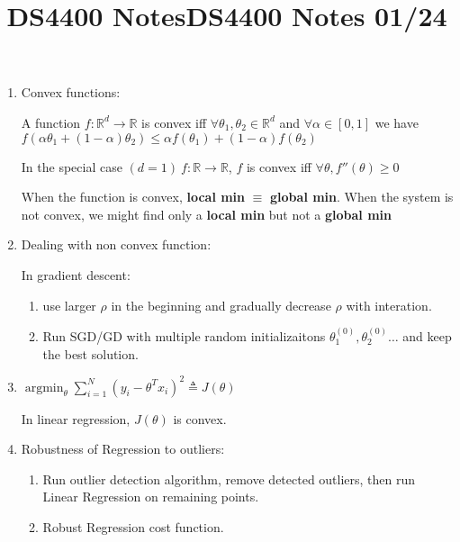 \documentclass[12pt]{article}
\title{DS4400 Notes}
\date{}
\author{}
\DeclareMathOperator*{\argmin}{\arg\min}
\begin{document}
    \maketitle

    \begin{multicols}{2}
        \title{DS4400 Notes 01/24}
        \maketitle
        \begin{enumerate}
            \item Convex functions:
            
            A function $f:\mathbb{R}^d \rightarrow \mathbb{R}$ is convex iff $\forall \theta_1, \theta_2 \in \mathbb{R}^d $ and $\forall \alpha \in [0,1]$ we have 
            $f(\alpha\theta_1 + (1-\alpha)\theta_2) \le \alpha f(\theta_1) + (1-\alpha)f(\theta_2)$
    
            In the special case $(d=1) \ f:\mathbb{R}\rightarrow \mathbb{{R}}$, $f$ is convex iff $\forall \theta, f''(\theta) \ge 0$

            When the function is convex, \textbf{local min} $\equiv$ \textbf{global min}. When the system is not convex, we might find only a \textbf{local min} but not a \textbf{global min}

            \item Dealing with non convex function:
            
            In gradient descent: 
            \begin{enumerate}
                \item use larger $\rho$ in the beginning and gradually decrease $\rho$ with interation.
                \item Run SGD/GD with multiple random initializaitons $\theta_1^{(0)}, \theta_2^{(0)} \dots $ and keep the best solution.
            \end{enumerate}

            \item $\argmin_{\theta} \sum_{i = 1}^N (y_i - \theta^Tx_i)^2 \triangleq J(\theta)$ 
            
            In linear regression, $J(\theta)$ is convex.

            \item Robustness of Regression to outliers:
            
            \begin{enumerate}
                \item Run outlier detection algorithm, remove detected outliers, then run Linear Regression on remaining points.
                \item Robust Regression cost function.
                

\end{enumerate}
\end{enumerate}
\end{multicols}
\end{document}
